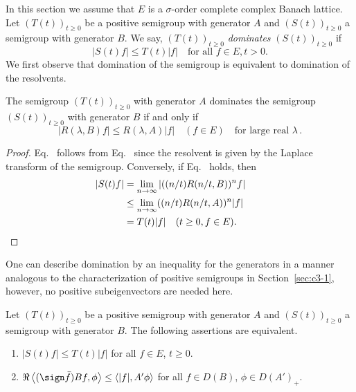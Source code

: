 In this section we assume that $E$ is a $\sigma$-order complete complex Banach lattice. 
Let $(T(t))_{t \geq 0}$ be a positive semigroup with generator $A$ and $(S(t))_{t \geq 0}$ a semigroup with generator $B$. 
We say, $(T(t))_{t \geq 0}$ \emph{dominates} $(S(t))_{t \geq 0}$ if
\begin{equation}\label{eq:c2-4.1}
|S(t)f| \leq T(t)|f| \quad \text{for all } f \in E, t > 0.
\end{equation}
We first observe that domination of the semigroup is equivalent to domination of the resolvents.
\begin{proposition}\label{prop:c2-4.1}
The semigroup $(T(t))_{t \geq 0}$ with generator $A$ dominates the semigroup $(S(t))_{t \geq 0}$ with generator $B$ if and only if
\begin{equation}\label{eq:c2-4.2}
|R(\lambda,B)f| \leq R(\lambda,A)|f| \quad (f \in E) \quad \text{for large real }  \lambda\,.
\end{equation}
\end{proposition}
\begin{proof}
Eq.~ follows from Eq.~ since the resolvent is given by the Laplace transform of the semigroup. 
Conversely, if Eq.~ holds, then
\begin{align*}
|S(t)f| &= \lim_{n \to \infty} |((n/t)R(n/t,B))^{n}f|\\
&\leq \lim_{n \to \infty} ((n/t)R(n/t,A))^{n}|f|\\
&= T(t)|f| \quad (t \geq 0, f \in E).
&&\qedhere
\end{align*}
\end{proof}
One can describe domination by an inequality for the generators in a manner analogous to the characterization of positive semigroups in Section~\ref{sec:c3-1}, however, no positive subeigenvectors are needed here.
\begin{theorem}\label{thm:c2-4.2}
Let $(T(t))_{t \geq 0}$ be a positive semigroup with generator $A$ and $(S(t))_{t \geq 0}$ a semigroup with generator $B$. The following assertions are equivalent.
\begin{enumerate}[\upshape (a)]
\item \label{thm:c2-4.2-1}
$|S(t)f| \leq T(t)|f|$ for all $f \in E$, $t \geq 0$.
\item \label{thm:c2-4.2-2}
$\Re\left\langle(\sign  \bar{f}) Bf,\phi\right\rangle \leq \langle|f|,A'\phi\rangle$ for all $f \in D(B)$, $\phi \in D(A')_{+}$.
\end{enumerate}
\end{theorem}
